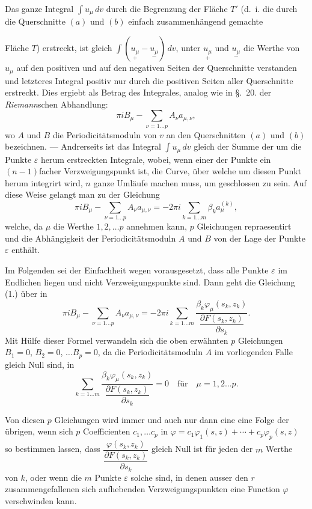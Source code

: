 \documentclass{article}
\begin{document}
Das ganze Integral $\displaystyle\int u_{\mu}\,dv$ durch die Begrenzung der Fläche $T'$ (d.~i. die durch die Querschnitte $(a)$ und $(b)$ einfach zusammenhängend gemachte

Fläche $T$) erstreckt, ist gleich $\displaystyle\int (\underset{+}{u_{\mu}} - \underset{-}{u_{\mu}})\,dv$, unter $\underset{+}{u_{\mu}}$ und $\underset{-}{u_{\mu}}$ die Werthe von $u_{\mu}$ auf den positiven und auf den negativen Seiten der Querschnitte verstanden und letzteres Integral positiv nur durch die positiven Seiten aller Querschnitte erstreckt. Dies ergiebt als Betrag des Integrales, analog wie in §.~20. der \emph{Riemann}schen Abhandlung:
\[ \pi i B_{\mu} - \sum_{\nu=1\ldots p} A_{\nu} a_{\mu, \nu}, \]
wo $A$ und $B$ die Periodicitätsmoduln von $v$ an den Querschnitten $(a)$ und $(b)$ bezeichnen. --- Andrerseits ist das Integral $\displaystyle\int u_{\mu}\,dv$ gleich der Summe der um die Punkte $\varepsilon$ herum erstreckten Integrale, wobei, wenn einer der Punkte ein $(n-1)$facher Verzweigungspunkt ist, die Curve, über welche um diesen Punkt herum integrirt wird, $n$ ganze Umläufe machen muss, um geschlossen zu sein. Auf diese Weise gelangt man zu der Gleichung
\[ \pi i B_{\mu} - \sum_{\nu=1\ldots p} A_{\nu} a_{\mu, \nu} = -2\pi i \sum_{k=1\ldots m} \beta_{k} a_{\mu}^{(k)}, \tag{1.} \]
welche, da $\mu$ die Werthe $1, 2, \ldots p$ annehmen kann, $p$ Gleichungen repraesentirt und die Abhängigkeit der Periodicitätsmoduln $A$ und $B$ von der Lage der Punkte $\varepsilon$ enthält.

Im Folgenden sei der Einfachheit wegen vorausgesetzt, dass alle Punkte $\varepsilon$ im Endlichen liegen und nicht Verzweigungspunkte sind. Dann geht die Gleichung (1.) über in
\[ \pi i B_{\mu} - \sum_{\nu=1\ldots p} A_{\nu} a_{\mu, \nu} = -2\pi i \sum_{k=1\ldots m} \frac{\beta_{k} \varphi_{\mu}(s_{k}, z_{k})}{\dfrac{\partial F(s_{k}, z_{k})}{\partial s_{k}}}. \tag{2.} \]
Mit Hülfe dieser Formel verwandeln sich die oben erwähnten $p$ Gleichungen $B_{1} = 0$, $B_{2} = 0$, $\ldots B_{p} = 0$, da die Periodicitätsmoduln $A$ im vorliegenden Falle gleich Null sind, in
\[ \sum_{k=1\ldots m} \frac{\beta_{k} \varphi_{\mu}(s_{k}, z_{k})}{\dfrac{\partial F(s_{k}, z_{k})}{\partial s_{k}}} = 0 \quad \text{für} \quad \mu = 1, 2 \ldots p. \]

Von diesen $p$ Gleichungen wird immer und auch nur dann eine eine Folge der übrigen, wenn sich $p$ Coefficienten $c_{1}, \ldots c_{p}$ in $\varphi = c_{1} \varphi_{1}(s, z) + \cdots + c_{p} \varphi_{p}(s, z)$ so bestimmen lassen, dass $\dfrac{\varphi(s_{k}, z_{k})}{\dfrac{\partial F(s_{k}, z_{k})}{\partial s_{k}}}$ gleich Null ist für jeden der $m$ Werthe von $k$, oder wenn die $m$ Punkte $\varepsilon$ solche sind, in denen ausser den $r$ zusammengefallenen sich aufhebenden Verzweigungspunkten eine Function $\varphi$ verschwinden kann.
\end{document}
